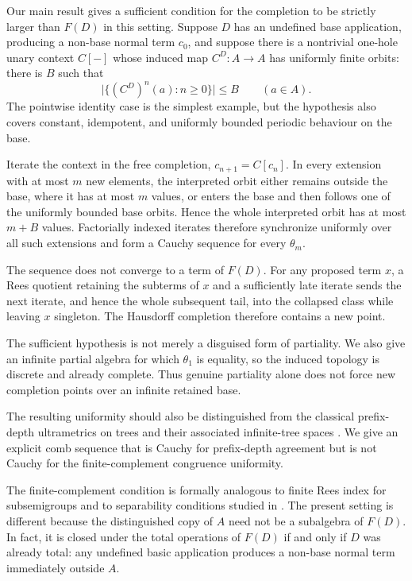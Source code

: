 \documentclass{birkau}
\theoremstyle{definition}
\theoremstyle{remark}
\begin{document}
Our main result gives a sufficient condition for the completion to be strictly
larger than $F(D)$ in this setting.  Suppose $D$ has an undefined base
application, producing a non-base normal term $c_0$, and suppose there is a
nontrivial one-hole unary context $C[-]$ whose induced map $C^D:A\to A$ has
uniformly finite orbits: there is $B$ such that
\[
 \bigl|\{(C^D)^n(a):n\ge0\}\bigr|\le B
 \qquad(a\in A).
\]
The pointwise identity case is the simplest example, but the hypothesis also
covers constant, idempotent, and uniformly bounded periodic behaviour on the
base.

Iterate the context in the free completion, $c_{n+1}=C[c_n]$.  In every
extension with at most $m$ new elements, the interpreted orbit either remains
outside the base, where it has at most $m$ values, or enters the base and then
follows one of the uniformly bounded base orbits.  Hence the whole interpreted
orbit has at most $m+B$ values.  Factorially indexed iterates therefore
synchronize uniformly over all such extensions and form a Cauchy sequence for
every $\theta_m$.

The sequence does not converge to a term of $F(D)$.  For any proposed term
$x$, a Rees quotient retaining the subterms of $x$ and a sufficiently late
iterate sends the next iterate, and hence the whole subsequent tail, into the
collapsed class while leaving $x$ singleton.  The Hausdorff completion
therefore contains a new point.

The sufficient hypothesis is not merely a disguised form of partiality.  We
also give an infinite partial algebra for which $\theta_1$ is equality, so the
induced topology is discrete and already complete.  Thus genuine partiality
alone does not force new completion points over an infinite retained base.

The resulting uniformity should also be distinguished from the classical
prefix-depth ultrametrics on trees and their associated infinite-tree spaces
\cite{ArnoldNivat1980,Courcelle1983}.  We give an explicit comb sequence that
is Cauchy for prefix-depth agreement but is not Cauchy for the
finite-complement congruence uniformity.

The finite-complement condition is formally analogous to finite Rees index for
subsemigroups \cite{RuskucThomas1998,CainMaltcev2013} and to separability
conditions studied in \cite{MillerOReillyQuickRuskuc2022}.  The present setting
is different because the distinguished copy of $A$ need not be a subalgebra of
$F(D)$.  In fact, it is closed under the total operations of $F(D)$ if and only
if $D$ was already total: any undefined basic application produces a non-base
normal term immediately outside $A$.
\end{document}

